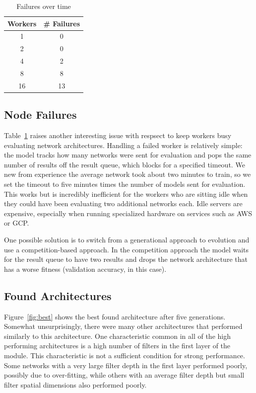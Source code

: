 \documentclass[conference]{IEEEtran}
\begin{document}
\begin{table}
  \centering
  \caption{Failures over time}
  \label{tab:failures}
  \begin{tabular}{cc}\toprule
    \textbf{Workers} & \textbf{\# Failures}\\\midrule
    1 & 0\\
    2 & 0\\
    4 & 2\\
    8 & 8\\
    16 & 13\\\bottomrule
  \end{tabular}
\end{table}
\subsection{Node Failures}
Table~\ref{tab:failures} raises another interesting issue with respsect
to keep workers busy evaluating network architectures. Handling a failed
worker is relatively simple: the model tracks how many networks were
sent for evaluation and pops the same number of results off the result
queue, which blocks for a specified timeout. We new from experience the
average network took about two minutes to train, so we set the timeout to
five minutes times the number of models sent for evaluation. This works
but is incredibly inefficient for the workers who are sitting idle when
they could have been evaluating two additional networks each. Idle servers
are expensive, especially when running specialized hardware on services
such as AWS or GCP.

One possible solution is to switch from a generational approach to evolution
and use a competition-based approach. In the competition approach the model
waits for the result queue to have two results and drops the network architecture
that has a worse fitness (validation accuracy, in this case).

\subsection{Found Architectures}
Figure~\ref{fig:best} shows the best found architecture after five generations.
Somewhat unsurprisingly, there were many other architectures that performed
similarly to this architecture. One characteristic common in all of the high
performing architectures is a high number of filters in the first layer of
the module. This characteristic is not a sufficient condition for strong
performance. Some networks with a very large filter depth in the first layer
performed poorly, possibly due to over-fitting, while others with an average
filter depth but small filter spatial dimensions also performed poorly.
\end{document}
